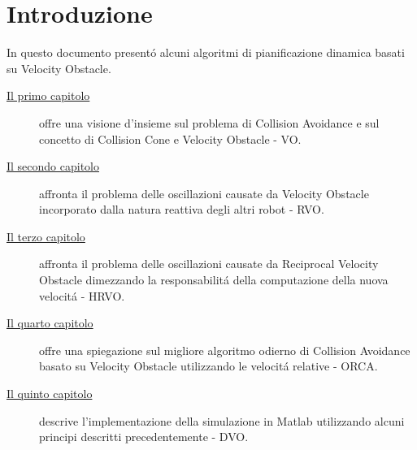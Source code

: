 
\cleardoublepage
{}

\chapter*{Introduzione}
In questo documento present\'o alcuni algoritmi di pianificazione dinamica basati su Velocity Obstacle.
\begin{description}
\item[{\hyperref[cap:vo]{Il primo capitolo}}]
offre una visione d'insieme sul problema di Collision Avoidance e sul concetto di Collision Cone e Velocity Obstacle - VO.
\item[{\hyperref[cap:rvo]{Il secondo capitolo}}]
affronta il problema delle oscillazioni causate da Velocity Obstacle incorporato dalla natura reattiva degli altri robot - RVO.
\item[{\hyperref[cap:hrvo]{Il terzo capitolo}}]
affronta il problema delle oscillazioni causate da Reciprocal Velocity Obstacle dimezzando la responsabilit\'a della computazione della nuova velocit\'a - HRVO.
\item[{\hyperref[cap:orca]{Il quarto capitolo}}]
offre una spiegazione sul migliore algoritmo odierno di Collision Avoidance basato su Velocity Obstacle utilizzando le velocit\'a relative - ORCA.
\item[{\hyperref[cap:dvo]{Il quinto capitolo}}]
descrive l'implementazione della simulazione in Matlab utilizzando alcuni principi descritti precedentemente - DVO.
\end{description}


